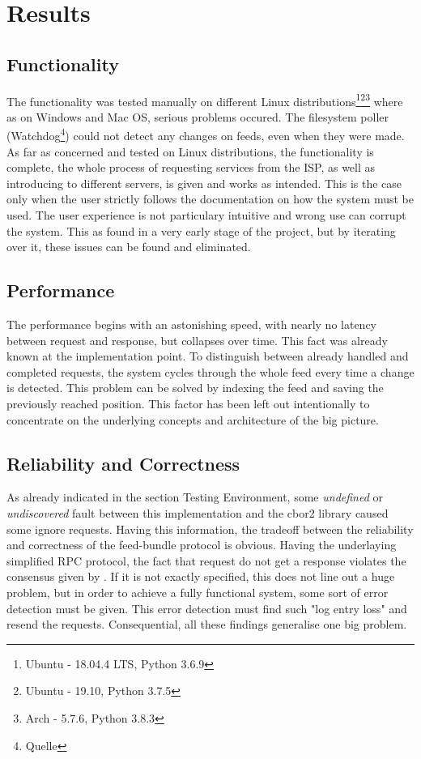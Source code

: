 \section{Results}
\subsection{Functionality}
The functionality was tested manually on different Linux distributions\footnote{Ubuntu - 18.04.4 LTS, Python 3.6.9}\footnote{Ubuntu - 19.10, Python 3.7.5}\footnote{Arch - 5.7.6, Python 3.8.3} where as on Windows and Mac OS, serious problems occured. The filesystem poller (Watchdog\footnote{Quelle}) could not detect any changes on feeds, even when they were made. As far as concerned and tested on Linux distributions, the functionality is complete, the whole process of requesting services from the ISP, as well as introducing to different servers, is given and works as intended. This is the case only when the user strictly follows the documentation on how the system must be used. The user experience is not particulary intuitive and wrong use can corrupt the system. This as found in a very early stage of the project, but by iterating over it, these issues can be found and eliminated.
\subsection{Performance}
The performance begins with an astonishing speed, with nearly no latency between request and response, but collapses over time. This fact was already known at the implementation point. To distinguish between already handled and completed requests, the system cycles through the whole feed every time a change is detected. This problem can be solved by indexing the feed and saving the previously reached position. This factor has been left out intentionally to concentrate on the underlying concepts and architecture of the big 
picture.
\subsection{Reliability and Correctness}
As already indicated in the section Testing Environment, some \textit{undefined} or \textit{undiscovered} fault between this implementation and the cbor2 library caused some ignore requests. Having this information, the tradeoff between the reliability and correctness of the feed-bundle protocol is obvious. Having the underlaying simplified RPC protocol, the fact that request do not get a response violates the consensus given by \citet{birrell1984implementing}. If it is not exactly specified, this does not line out a huge problem, but in order to achieve a fully functional system, some sort of error detection must be given. This error detection must find such "log entry loss" and resend the requests. Consequential, all these findings generalise one big problem.

